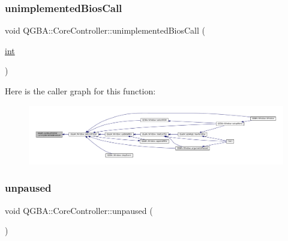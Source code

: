 \subsubsection{\texorpdfstring{unimplemented\+Bios\+Call}{unimplementedBiosCall}}
{\footnotesize\ttfamily void Q\+G\+B\+A\+::\+Core\+Controller\+::unimplemented\+Bios\+Call (\begin{DoxyParamCaption}\item[{\mbox{\hyperlink{ioapi_8h_a787fa3cf048117ba7123753c1e74fcd6}{int}}}]{ }\end{DoxyParamCaption})\hspace{0.3cm}{\ttfamily [signal]}}

Here is the caller graph for this function\+:
\nopagebreak
\begin{figure}[H]
\begin{center}
\leavevmode
\includegraphics[width=350pt]{class_q_g_b_a_1_1_core_controller_a9bc1050a6f4a56afd974a7ed25a97298_icgraph}
\end{center}
\end{figure}
\mbox{\label{class_q_g_b_a_1_1_core_controller_ae4f3b1896454fad0d8d963e2ae495833}} 
\subsubsection{\texorpdfstring{unpaused}{unpaused}}
{\footnotesize\ttfamily void Q\+G\+B\+A\+::\+Core\+Controller\+::unpaused (\begin{DoxyParamCaption}{ }\end{DoxyParamCaption})\hspace{0.3cm}{\ttfamily [signal]}}

